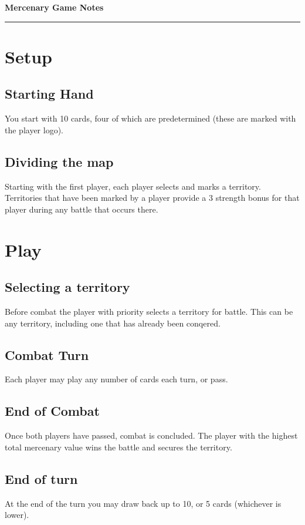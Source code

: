 {
\setlength{\parskip}{1em}
\titlespacing*{\section}{0pt}{0.5em}{0.5em}
\titlespacing*{\subsection}{0pt}{0.5em}{0em}
\titlespacing*{\subsubsection}{0pt}{0.5em}{0em}
\setlength{\columnsep}{8mm}
\setlength{\columnseprule}{0.1mm}
\noindent
{
   	\bf
    \color{red}
  	\Huge{Mercenary Game}
   	\hfill
   	\large{Notes}
}
\rule{\textwidth}{0.5mm}
\begin{multicols}{2}
\section{Setup}
\subsection{Starting Hand}
You start with 10 cards, four of which are predetermined (these are marked with the player logo).

\subsection{Dividing the map}
Starting with the first player, each player selects and marks a territory. Territories that have been marked by a player provide a 3 strength bonus for that player during any battle that occurs there.

\section{Play}
\subsection{Selecting a territory}
Before combat the player with priority selects a territory for battle. This can be any territory, including one that has already been conqered.

\subsection{Combat Turn}
Each player may play any number of cards each turn, or pass.

\subsection{End of Combat}
Once both players have passed, combat is concluded. The player with the highest total mercenary value wins the battle and secures the territory.

\subsection{End of turn}
At the end of the turn you may draw back up to 10, or 5 cards (whichever is lower).
\end{multicols}
}